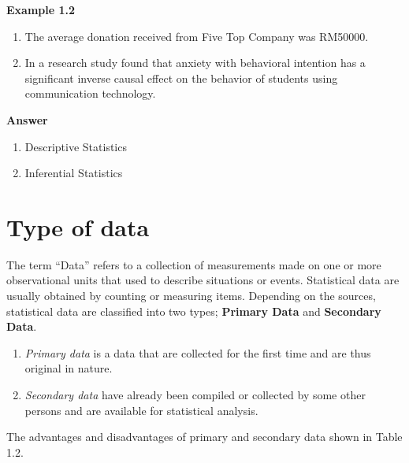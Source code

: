 \documentclass[
  a4paper,
  DIV=11,
  numbers=noendperiod,
  oneside]{scrreprt}
\providecommand{\tightlist}{%
  \setlength{\itemsep}{0pt}\setlength{\parskip}{0pt}}\usepackage{longtable,booktabs,array}
\begin{document}
{\textbf{Example 1.2}}

\begin{enumerate}
\def\labelenumi{\alph{enumi})}
\tightlist
\item
  The average donation received from Five Top Company was RM50000.
\item
  In a research study found that anxiety with behavioral intention has a
  significant inverse causal effect on the behavior of students using
  communication technology.
\end{enumerate}

{\textbf{Answer}}

\begin{enumerate}
\def\labelenumi{\alph{enumi})}
\tightlist
\item
  Descriptive Statistics
\item
  Inferential Statistics
\end{enumerate}

\hypertarget{type-of-data}{%
\section{Type of data}\label{type-of-data}}

The term ``Data'' refers to a collection of measurements made on one or
more observational units that used to describe situations or events.
Statistical data are usually obtained by counting or measuring items.
Depending on the sources, statistical data are classified into two
types; \textbf{Primary Data} and \textbf{Secondary Data}.

\begin{enumerate}
\def\labelenumi{\alph{enumi})}
\item
  \emph{Primary data} is a data that are collected for the first time
  and are thus original in nature.
\item
  \emph{Secondary data} have already been compiled or collected by some
  other persons and are available for statistical analysis.
\end{enumerate}

The advantages and disadvantages of primary and secondary data shown in
Table 1.2.
\end{document}
